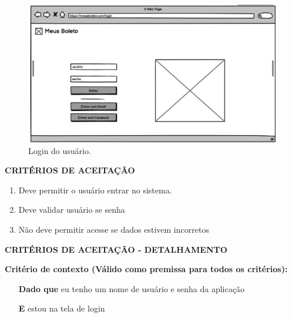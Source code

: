 \begin{figure}[htb]
	\caption{\label{fig:hu02}Login do usuário.}
	\begin{center}
		\includegraphics[scale=0.5]{images/Login.png}
	\end{center}
\end{figure}


\textbf{CRITÉRIOS DE ACEITAÇÃO}

\begin{enumerate}
    \item Deve permitir o usuário entrar no sistema.
    \item Deve validar usuário se senha
    \item Não deve permitir acesse se dados estivem incorretos
\end{enumerate}

\textbf{CRITÉRIOS DE ACEITAÇÃO - DETALHAMENTO}

\textbf{Critério de contexto (Válido como premissa para todos os critérios):}

\begin{itemize}
    \item[\textbf{Dado que}] eu tenho um nome de usuário e senha da aplicação
    \item[\textbf{E}] estou na tela de login
\end{itemize}


